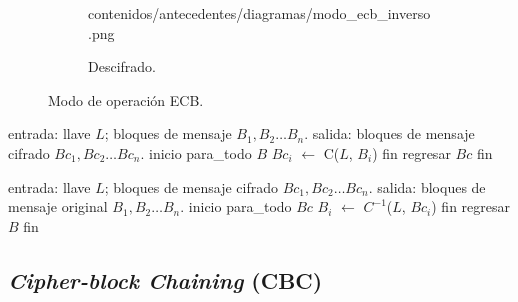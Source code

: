 \begin{figure}[H]
\begin{subfigure}{0.45\textwidth}
\begin{center}
            {contenidos/antecedentes/diagramas/modo_ecb_inverso.png}
          \caption{Descifrado.}
      \end{center}
  \end{subfigure}
  \caption{Modo de operación ECB.}
  \label{figura:ecb}
\end{figure}

\begin{algoritmo}[caption={Modo de operación ECB, cifrado.}]
  entrada: llave $ L $; bloques de mensaje $ B_1, B_2 \dots B_n $.
  salida: bloques de mensaje cifrado $ Bc_1, Bc_2 \dots Bc_n $.
  inicio
    para_todo $B$
      $Bc_i$ $\gets$ C($L$, $B_i$)
    fin
    regresar $Bc$
  fin
\end{algoritmo}

\begin{algoritmo}[caption={Modo de operación ECB, descifrado.}]
  entrada: llave $ L $; bloques de mensaje cifrado $ Bc_1, Bc_2 \dots Bc_n $.
  salida: bloques de mensaje original $ B_1, B_2 \dots B_n $.
  inicio
    para_todo $Bc$
      $B_i$ $\gets$ $C^{-1}$($L$, $Bc_i$)
    fin
    regresar $B$
  fin
\end{algoritmo}

\subsection{\textit{Cipher-block Chaining} (CBC)}


